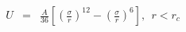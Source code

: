 


\begin{eqnarray}
	U &=& \frac{A}{36}  \left[ \left( \frac{\sigma}{r} \right)^{12} - \left( \frac{ \sigma}{r} \right)^6 \right], ~~ r < r_c \nonumber
\end{eqnarray}



